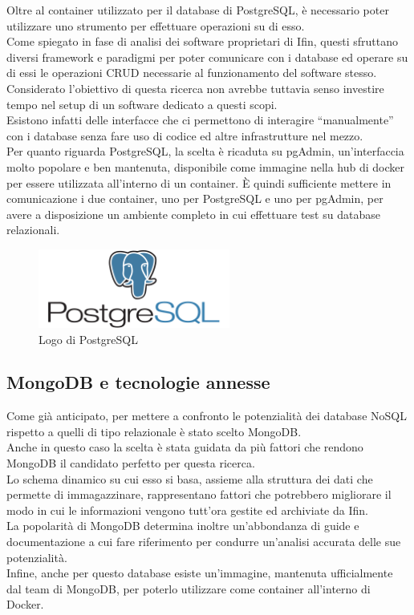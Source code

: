 \noindent Oltre al container utilizzato per il database di PostgreSQL, è necessario poter utilizzare uno strumento per effettuare operazioni su di esso.\\
Come spiegato in fase di analisi dei software proprietari di Ifin, questi sfruttano diversi framework e paradigmi per poter comunicare con i database ed operare su di essi le \gls{operazioni CRUD} necessarie al funzionamento del software stesso. Considerato l'obiettivo di questa ricerca non avrebbe tuttavia senso investire tempo nel setup di un software dedicato a questi scopi.\\
Esistono infatti delle interfacce che ci permettono di interagire ``manualmente'' con i database senza fare uso di codice ed altre infrastrutture nel mezzo.\\
Per quanto riguarda PostgreSQL, la scelta è ricaduta su pgAdmin, un'interfaccia molto popolare e ben mantenuta, disponibile come immagine nella hub di docker per essere utilizzata all'interno di un container. È quindi sufficiente mettere in comunicazione i due container, uno per PostgreSQL e uno per pgAdmin, per avere a disposizione un ambiente completo in cui effettuare test su database relazionali.

\begin{figure}[htbp]
\begin{center}
\includegraphics[height=7em]{immagini/tecnologies-logos/postgresql-logo.png}
\caption{Logo di PostgreSQL}
\end{center}
\end{figure}

\subsection{MongoDB e tecnologie annesse}
Come già anticipato, per mettere a confronto le potenzialità dei database NoSQL rispetto a quelli di tipo relazionale è stato scelto MongoDB.\\
Anche in questo caso la scelta è stata guidata da più fattori che rendono MongoDB il candidato perfetto per questa ricerca.\\
Lo schema dinamico su cui esso si basa, assieme alla struttura dei dati che permette di immagazzinare, rappresentano fattori che potrebbero migliorare il modo in cui le informazioni vengono tutt'ora gestite ed archiviate da Ifin.\\
La popolarità di MongoDB determina inoltre un'abbondanza di guide e documentazione a cui fare riferimento per condurre un'analisi accurata delle sue potenzialità.\\
Infine, anche per questo database esiste un'immagine, mantenuta ufficialmente dal team di MongoDB, per poterlo utilizzare come container all'interno di Docker.\\

